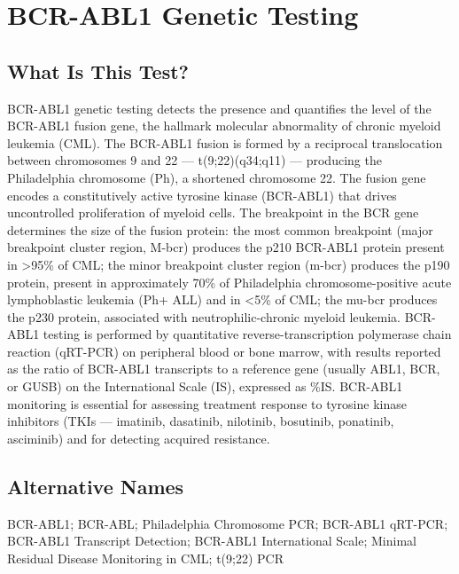 \chapter{BCR-ABL1 Genetic Testing}

\section*{What Is This Test?}
BCR-ABL1 genetic testing detects the presence and quantifies the level of the BCR-ABL1 fusion gene, the hallmark molecular abnormality of chronic myeloid leukemia (CML). The BCR-ABL1 fusion is formed by a reciprocal translocation between chromosomes 9 and 22 --- t(9;22)(q34;q11) --- producing the Philadelphia chromosome (Ph), a shortened chromosome 22. The fusion gene encodes a constitutively active tyrosine kinase (BCR-ABL1) that drives uncontrolled proliferation of myeloid cells. The breakpoint in the BCR gene determines the size of the fusion protein: the most common breakpoint (major breakpoint cluster region, M-bcr) produces the p210 BCR-ABL1 protein present in >95\% of CML; the minor breakpoint cluster region (m-bcr) produces the p190 protein, present in approximately 70\% of Philadelphia chromosome-positive acute lymphoblastic leukemia (Ph+ ALL) and in <5\% of CML; the mu-bcr produces the p230 protein, associated with neutrophilic-chronic myeloid leukemia. BCR-ABL1 testing is performed by quantitative reverse-transcription polymerase chain reaction (qRT-PCR) on peripheral blood or bone marrow, with results reported as the ratio of BCR-ABL1 transcripts to a reference gene (usually ABL1, BCR, or GUSB) on the International Scale (IS), expressed as \%IS. BCR-ABL1 monitoring is essential for assessing treatment response to tyrosine kinase inhibitors (TKIs --- imatinib, dasatinib, nilotinib, bosutinib, ponatinib, asciminib) and for detecting acquired resistance.

\section*{Alternative Names}
BCR-ABL1; BCR-ABL; Philadelphia Chromosome PCR; BCR-ABL1 qRT-PCR; BCR-ABL1 Transcript Detection; BCR-ABL1 International Scale; Minimal Residual Disease Monitoring in CML; t(9;22) PCR

